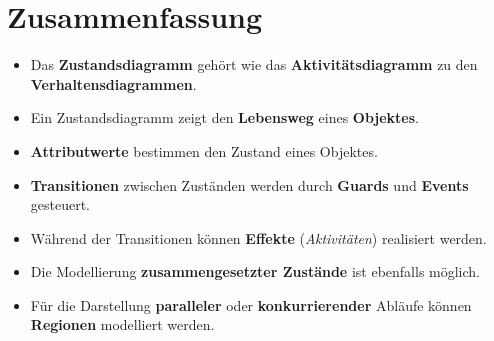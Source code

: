 \section{Zusammenfassung}

\begin{itemize}
    \item Das \textbf{Zustandsdiagramm} gehört wie das \textbf{Aktivitätsdiagramm} zu den \textbf{Verhaltensdiagrammen}.
    \item Ein Zustandsdiagramm zeigt den \textbf{Lebensweg} eines \textbf{Objektes}.
    \item \textbf{Attributwerte} bestimmen den Zustand eines Objektes.
    \item \textbf{Transitionen} zwischen Zuständen werden durch \textbf{Guards} und \textbf{Events} gesteuert.
    \item Während der Transitionen können \textbf{Effekte} (\textit{Aktivitäten}) realisiert werden.
    \item Die Modellierung \textbf{zusammengesetzter Zustände} ist ebenfalls möglich.
    \item Für die Darstellung \textbf{paralleler} oder  \textbf{konkurrierender} Abläufe können \textbf{Regionen} modelliert werden.
\end{itemize}